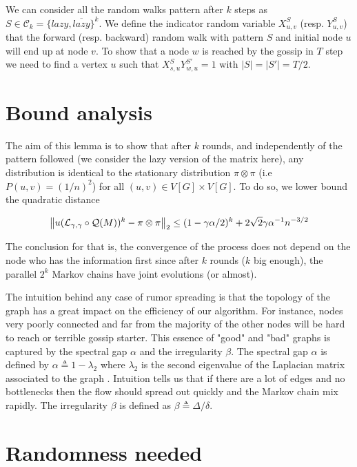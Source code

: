 \documentclass[10pt,journal,a4paper]{IEEEtran}
\begin{document}
We can consider all the random walks pattern after $k$ steps as $S \in \mathcal C_k = \{ lazy, \overline{lazy} \}^k$. We define the indicator random variable $X_{u,v}^S$ (resp. $Y_{u,v}^S$) that the forward (resp. backward) random walk with pattern $S$ and initial node $u$ will end up at node $v$. To show that a node $w$ is reached by the gossip in $T$ step we need to find a vertex $u$ such that $X_{s,u}^{S}Y_{w,u}^{S'} = 1$ with $|S| = |S'| = T/2$.

\section{Bound analysis}

The aim of this lemma is to show that after $k$ rounds, and independently of the pattern followed (we consider the lazy version of the matrix here), any distribution is identical to the stationary distribution $\pi \otimes \pi$ (i.e $P(u,v)=(1/n)^2$) for all $(u,v) \in V[G] \times V[G]$. To do so, we lower bound the quadratic distance

\[
  \left\lVert u(\mathcal L_{\gamma,\gamma} \circ \mathcal Q(M))^k - \pi \otimes \pi\right\rVert_2 \leq (1 - \gamma \alpha / 2)^k + 2 \sqrt 2 \gamma \alpha^{-1} n^{-3/2}
\]

The conclusion for that is, the convergence of the process does not depend on the node who has the information first since after $k$ rounds ($k$ big enough), the parallel $2^k$ Markov chains have joint evolutions (or almost).

The intuition behind any case of rumor spreading is that the topology of the graph has a great impact on the efficiency of our algorithm. For instance, nodes very poorly connected and far from the majority of the other nodes will be hard to reach or terrible gossip starter. This essence of "good" and "bad" graphs is captured by the spectral gap $\alpha$ and the irregularity $\beta$. The spectral gap $\alpha$ is defined by $\alpha \triangleq 1 - \lambda_2$ where $\lambda_2$ is the second eigenvalue of the Laplacian matrix associated to the graph \cite{jerrum1988conductance}. 
Intuition tells us that if there are a lot of edges and no bottlenecks then the flow should spread out quickly and the Markov chain mix rapidly. The irregularity $\beta$ is defined as $\beta \triangleq \Delta/\delta$.

\section{Randomness needed}
\end{document}
